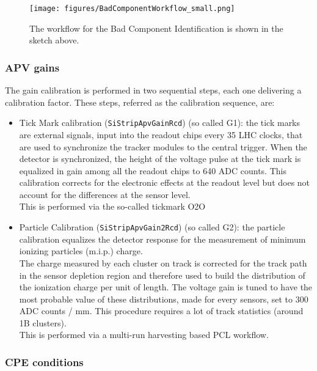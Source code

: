 \begin{figure}[htbp]
   \centering
	\texttt{[image: figures/BadComponentWorkflow\_small.png]}
   \caption{The workflow for the Bad Component Identification is shown in the sketch above.}
   \label{fig:fill10200PCL}
\end{figure}

\subsubsection{APV gains}
The gain calibration is performed in two sequential steps, each one delivering a
calibration factor. These steps, referred as the calibration sequence, are:

\begin{itemize}
\item Tick Mark calibration (\texttt{SiStripApvGainRcd}) (so called G1): the tick marks are external signals, input into the readout chips every 35 LHC clocks, that are used to synchronize the tracker modules to the central trigger.
When the detector is synchronized, the height of the voltage pulse at the tick mark is equalized in gain among all the readout chips to 640 ADC counts. This calibration corrects for the electronic effects at the readout level but does not account for the differences at the sensor level.\\
This is performed via the so-called tickmark O2O 
\item Particle Calibration (\texttt{SiStripApvGain2Rcd}) (so called G2): the particle calibration equalizes the detector response for the measurement of minimum ionizing particles (m.i.p.) charge. \\
The charge measured by each cluster on track is corrected for the track path in the sensor depletion region and therefore used to build the distribution of the ionization charge per unit of length. The voltage gain is tuned to have the most probable value of these distributions, made for every sensors, set to 300 ADC counts / mm. This procedure requires a lot of track statistics (around 1B clusters).\\
This is performed via a multi-run harvesting based PCL workflow.
\end{itemize}

\subsubsection{CPE conditions}

